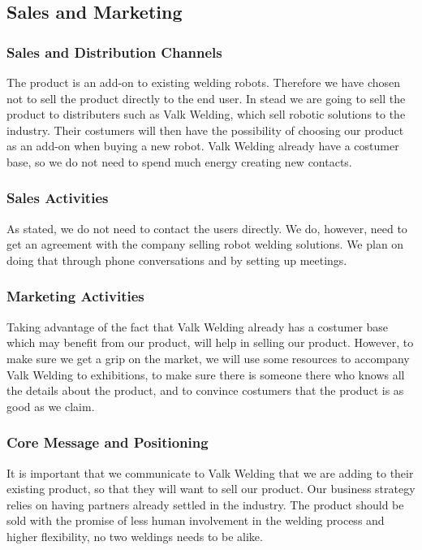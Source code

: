 \subsection{Sales and Marketing}
\subsubsection{Sales and Distribution Channels}
The product is an add-on to existing welding robots. Therefore we have chosen not to sell the product directly to the end user. 
In stead we are going to sell the product to distributers such as Valk Welding, which sell robotic solutions to the industry. 
Their costumers will then have the possibility of choosing our product as an add-on when buying a new robot.
Valk Welding already have a costumer base, so we do not need to spend much energy creating new contacts. 
\subsubsection{Sales Activities}
As stated, we do not need to contact the users directly. 
We do, however, need to get an agreement with the company selling robot welding solutions. 
We plan on doing that through phone conversations and by setting up meetings. 
\subsubsection{Marketing Activities}
Taking advantage of the fact that Valk Welding already has a costumer base which may benefit from our product, will help in selling our product.
However, to make sure we get a grip on the market, we will use some resources to accompany Valk Welding to exhibitions, to make sure there is someone there who knows all the details about the product, and to convince costumers that the product is as good as we claim. 
\subsubsection{Core Message and Positioning}
It is important that we communicate to Valk Welding that we are adding to their existing product, so that they will want to sell our product. Our business strategy relies on having partners already settled in the industry.
The product should be sold with the promise of less human involvement in the welding process and higher flexibility, no two weldings needs to be alike.

